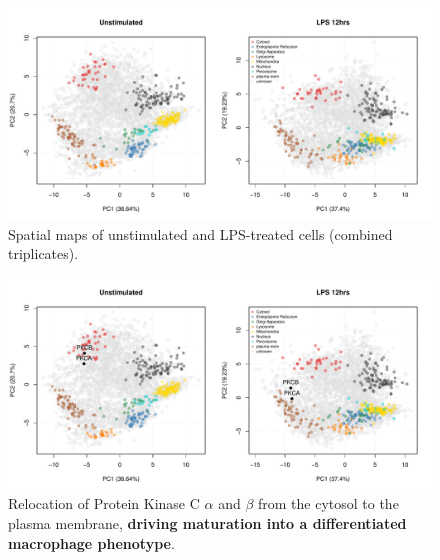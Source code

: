 \begin{frame}
  \begin{figure}[h]
    \centering
    \includegraphics[width=\linewidth]{./figs_local/lps.pdf}
    \caption{Spatial maps of unstimulated and LPS-treated cells
      (combined triplicates).}
  \end{figure}
\end{frame}

\begin{frame}
  \begin{figure}[h]
    \centering
    \includegraphics[width=\linewidth]{./figs_local/lps-pkc.pdf}
    \caption{Relocation of Protein Kinase C $\alpha$ and $\beta$ from the
      cytosol to the plasma membrane, \textbf{driving maturation into
        a differentiated macrophage phenotype}.}
  \end{figure}
\end{frame}

